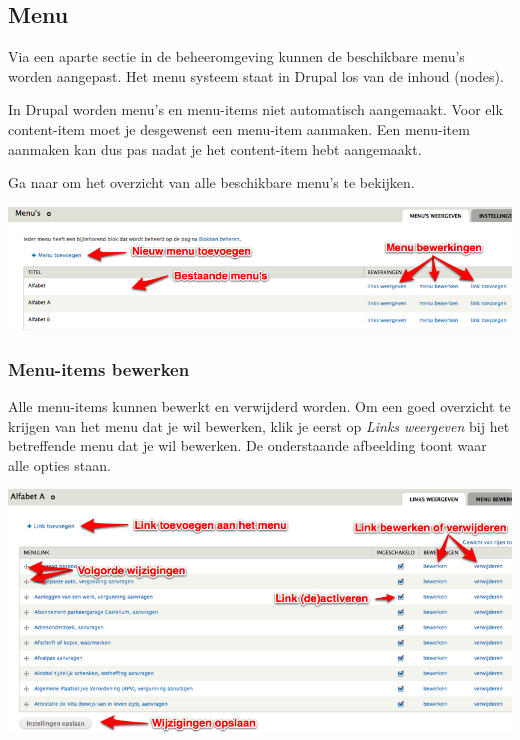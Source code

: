 \subsection{Menu}\label{menu}
Via een aparte sectie in de beheeromgeving kunnen de beschikbare menu's worden aangepast. Het menu systeem staat in Drupal los van de inhoud (nodes).

In Drupal worden menu's en menu-items niet automatisch aangemaakt. Voor elk content-item moet je desgewenst een menu-item aanmaken. Een menu-item aanmaken kan dus pas nadat je het content-item hebt aangemaakt.

Ga naar  om het overzicht van alle beschikbare menu's te bekijken.

\bigskip

\begin{center}
	\includegraphics[width=\textwidth]{img/menu1.png}
\end{center}

\subsubsection{Menu-items bewerken}\label{menuitemsbewerken}
Alle menu-items kunnen bewerkt en verwijderd worden. Om een goed overzicht te krijgen van het menu dat je wil bewerken, klik je eerst op \emph{Links weergeven} bij het betreffende menu dat je wil bewerken. De onderstaande afbeelding toont waar alle opties staan.

\bigskip

\begin{center}
	\includegraphics[width=\textwidth]{img/menu2.png}
\end{center}

